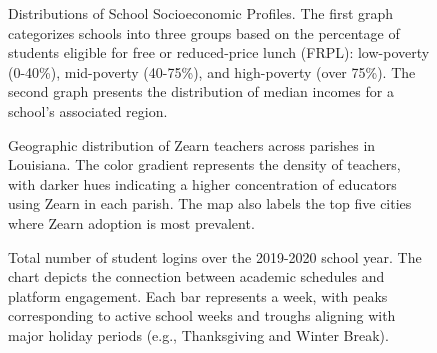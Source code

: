 \documentclass[
  number,
  preprint,
  3p,
  onecolumn]{elsarticle}
\begin{document}
\newpage{}

\begin{figure}

\begin{minipage}{0.50\linewidth}



\end{minipage}%
%
\begin{minipage}{0.50\linewidth}



\end{minipage}%

\caption{\label{fig-income-dist}Distributions of School Socioeconomic
Profiles. The first graph categorizes schools into three groups based on
the percentage of students eligible for free or reduced-price lunch
(FRPL): low-poverty (0-40\%), mid-poverty (40-75\%), and high-poverty
(over 75\%). The second graph presents the distribution of median
incomes for a school's associated region.}

\end{figure}%

\begin{figure}


\caption{\label{fig-teachers-map}Geographic distribution of Zearn
teachers across parishes in Louisiana. The color gradient represents the
density of teachers, with darker hues indicating a higher concentration
of educators using Zearn in each parish. The map also labels the top
five cities where Zearn adoption is most prevalent.}

\end{figure}%

\begin{figure}


\caption{\label{fig-logins-week}Total number of student logins over the
2019-2020 school year. The chart depicts the connection between academic
schedules and platform engagement. Each bar represents a week, with
peaks corresponding to active school weeks and troughs aligning with
major holiday periods (e.g., Thanksgiving and Winter Break).}

\end{figure}%
\end{document}
